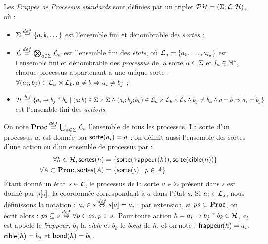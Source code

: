\begin{definition}
  Les \emph{Frappes de Processus standards} sont définies
  par un triplet $\mathcal{PH} = (\Sigma; \mathcal{L}; \mathcal{H})$, où :
  \begin{itemize}
    \item $\Sigma \stackrel{def}= \{a, b, \dots\}$ est l'ensemble fini et dénombrable des \emph{sortes} ;
    \item $\mathcal{L} \stackrel{def}= \bigotimes_{a \in \Sigma} \mathcal{L}_a$ est l'ensemble fini des \emph{états},
      où $\mathcal{L}_a = \{a_0, \ldots, a_{l_a}\}$ est l'ensemble fini et dénombrable
      des \emph{processus} de la sorte $a \in \Sigma$ et $l_a \in \mathbb{N}^*$,
      chaque processus appartenant à une unique sorte :
      $\forall (a_i; b_j) \in \mathcal{L}_a \times \mathcal{L}_b, a \neq b \Rightarrow a_i \neq b_j$ ;
    \item $\mathcal{H} \stackrel{def}= \{a_i\rightarrow b_j\Rsh b_k \mid (a; b) \in \Sigma \times \Sigma \wedge
      (a_i; b_j; b_k) \in \mathcal{L}_a \times \mathcal{L}_b \times \mathcal{L}_b \wedge
      b_j \neq b_k \wedge a = b \Rightarrow a_i = b_j \}$ est l'ensemble fini des \emph{actions}.
  \end{itemize}
\end{definition}
%
\noindent
On note $\mathbf{Proc} \stackrel{def}= \bigcup_{a \in \Sigma} \mathcal{L}_a$ l'ensemble de tous les processus.
La sorte d'un processus $a_i$ est donnée par $\mathsf{sorte}(a_i) = a$ ;
on définit aussi l'ensemble des sortes d'une action ou d'un ensemble de processus par :
\begin{align*}
  \forall h \in \mathcal{H}, \mathsf{sortes}(h) &= \{ \mathsf{sorte}(\mathsf{frappeur}(h)), \mathsf{sorte}(\mathsf{cible}(h)) \} \\
  \forall A \subset \mathbf{Proc}, \mathsf{sortes}(A) &= \{ \mathsf{sorte}(p) \mid p \in A \}
\end{align*}
Étant donné un état $s \in \mathcal{L}$, le processus de la sorte $a \in \Sigma$ présent dans $s$ est donné
par ${s[a]}$, \cad la coordonnée correspondant à $a$ dans l'état $s$.
Si $a_i \in \mathcal{L}_a$, nous définissons la notation : $a_i \in s \stackrel{def}\Leftrightarrow {s[a]} = a_i$ ;
par extension, si $ps \subset \mathbf{Proc}$, on écrit alors :
$ps \subseteq s \stackrel{def}\Leftrightarrow \forall p \in ps, p \in s$.
Pour toute action $h = a_i\rightarrow b_j\Rsh b_k \in \mathcal{H}$,
$a_i$ est appelé le \emph{frappeur}, $b_j$ la \emph{cible} et $b_k$ le \emph{bond} de $h$,
et on note : $\mathsf{frappeur}(h) = a_i$, $\mathsf{cible}(h) = b_j$ et $\mathsf{bond}(h) = b_k$.

